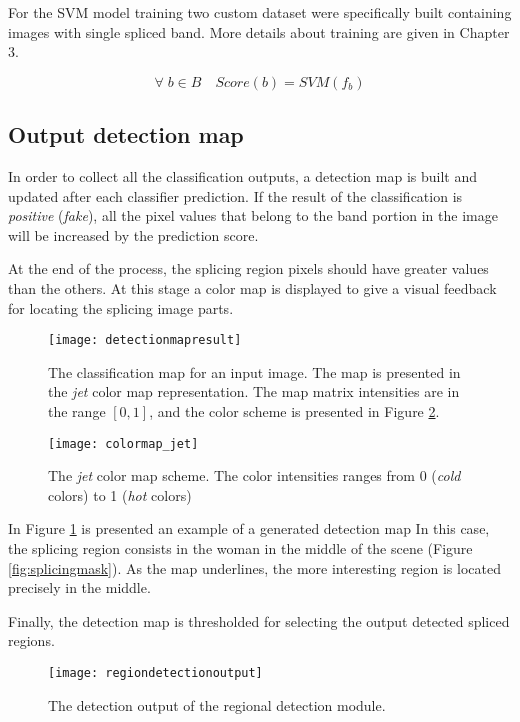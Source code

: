 For the SVM model training two custom dataset were specifically built containing images with single spliced band. More details about training are given in Chapter 3. 

$$
\forall \; b \in B \quad Score(b) = SVM(f_b)
$$

\subsection{Output detection map}

In order to collect all the classification outputs, a detection map is built and updated after each classifier prediction. If the result of the classification is \emph{positive} (\emph{fake}), all the pixel values that belong to the band portion in the image will be increased by the prediction score.

At the end of the process, the splicing region pixels should have greater values than the others. At this stage a color map is displayed to give a visual feedback for locating the splicing image parts.

\begin{figure}[h!]
  \centering
    \texttt{[image: detectionmapresult]}
    \caption{The classification map for an input image. The map is presented in the \emph{jet} color map representation. The map matrix intensities are in the range $[0, 1]$, and the color scheme is presented in Figure \ref{fig:colormapjet}.}\label{fig:regionsdetectionmap}
\end{figure}

\begin{figure}[h!]
  \centering
    \texttt{[image: colormap\_jet]}
    \caption{The \emph{jet} color map scheme. The color intensities ranges from 0 (\emph{cold} colors) to 1 (\emph{hot} colors)}
    \label{fig:colormapjet}
\end{figure}

In Figure \ref{fig:regionsdetectionmap} is presented an example of a generated detection map In this case, the splicing region consists in the woman in the middle of the scene (Figure \ref{fig:splicingmask}). As the map underlines, the more interesting region is located precisely in the middle.

Finally, the detection map is thresholded for selecting the output detected spliced regions.

\begin{figure}[h!]
  \centering
    \texttt{[image: regiondetectionoutput]}
    \caption{The detection output of the regional detection module.}\label{fig:regiondetectionoutput}
\end{figure}
